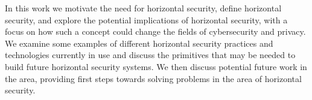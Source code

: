 In this work we motivate the need for horizontal security, define horizontal
security, and explore the potential implications of horizontal security, with a
focus on how such a concept could change the fields of cybersecurity and 
privacy. We examine some examples of different horizontal security practices and
technologies currently in use and discuss the primitives that may be needed to 
build future horizontal security systems. We then discuss potential future work
in the area, providing first steps towards solving problems in the area of
horizontal security.
